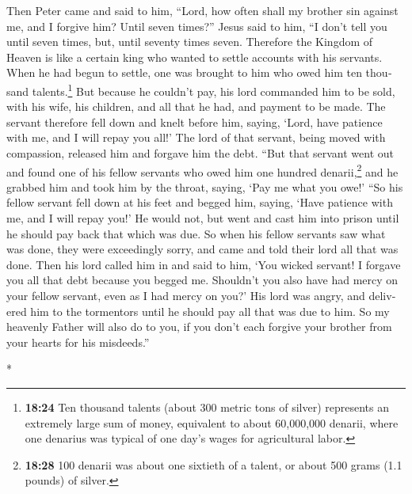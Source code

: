 \begin{paracol}{2}
\begin{otherlanguage}{english}
 Then Peter came and said to him, ``Lord, how often shall
my brother sin against me, and I forgive him? Until seven times?''
 Jesus said to him, ``I don't tell you until seven times,
but, until seventy times seven.  Therefore the Kingdom of
Heaven is like a certain king who wanted to settle accounts with his
servants.  When he had begun to settle, one was brought
to him who owed him ten thousand talents.\footnote{\textbf{18:24} Ten
  thousand talents (about 300 metric tons of silver) represents an
  extremely large sum of money, equivalent to about 60,000,000 denarii,
  where one denarius was typical of one day's wages for agricultural
  labor.}  But because he couldn't pay, his lord
commanded him to be sold, with his wife, his children, and all that he
had, and payment to be made.  The servant therefore fell
down and knelt before him, saying, `Lord, have patience with me, and I
will repay you all!'  The lord of that servant, being
moved with compassion, released him and forgave him the debt.
 ``But that servant went out and found one of his fellow
servants who owed him one hundred denarii,\footnote{\textbf{18:28} 100
  denarii was about one sixtieth of a talent, or about 500 grams (1.1
  pounds) of silver.} and he grabbed him and took him by the throat,
saying, `Pay me what you owe!'  ``So his fellow servant
fell down at his feet and begged him, saying, `Have patience with me,
and I will repay you!'  He would not, but went and cast
him into prison until he should pay back that which was due.
 So when his fellow servants saw what was done, they were
exceedingly sorry, and came and told their lord all that was done.
 Then his lord called him in and said to him, `You wicked
servant! I forgave you all that debt because you begged me.
 Shouldn't you also have had mercy on your fellow
servant, even as I had mercy on you?'  His lord was
angry, and delivered him to the tormentors until he should pay all that
was due to him.  So my heavenly Father will also do to
you, if you don't each forgive your brother from your hearts for his
misdeeds.''

\end{otherlanguage}

\switchcolumn[0]*

\hypertarget{salida-hacia-jerusaluxe9n-y-caminata-por-la-ribera-oriental-conversaciones-sobre-el-matrimonio-sobre-el-divorcio-y-la-renuncia-al-matrimonio}{%
}
\end{paracol}
